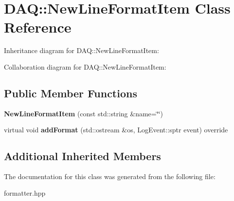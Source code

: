 \hypertarget{classDAQ_1_1NewLineFormatItem}{}\section{D\+AQ\+:\+:New\+Line\+Format\+Item Class Reference}
\label{classDAQ_1_1NewLineFormatItem}


Inheritance diagram for D\+AQ\+:\+:New\+Line\+Format\+Item\+:


Collaboration diagram for D\+AQ\+:\+:New\+Line\+Format\+Item\+:
\subsection*{Public Member Functions}
\begin{DoxyCompactItemize}
\item 
\mbox{\label{classDAQ_1_1NewLineFormatItem_af4d1d52866e05d7f251822c5f3fc560b}} 
{\bfseries New\+Line\+Format\+Item} (const std\+::string \&name=\char`\"{}\char`\"{})
\item 
\mbox{\label{classDAQ_1_1NewLineFormatItem_ab0db14f5fd40225da114607952f301f6}} 
virtual void {\bfseries add\+Format} (std\+::ostream \&os, Log\+Event\+::sptr event) override
\end{DoxyCompactItemize}
\subsection*{Additional Inherited Members}


The documentation for this class was generated from the following file\+:\begin{DoxyCompactItemize}
\item 
formatter.\+hpp\end{DoxyCompactItemize}
